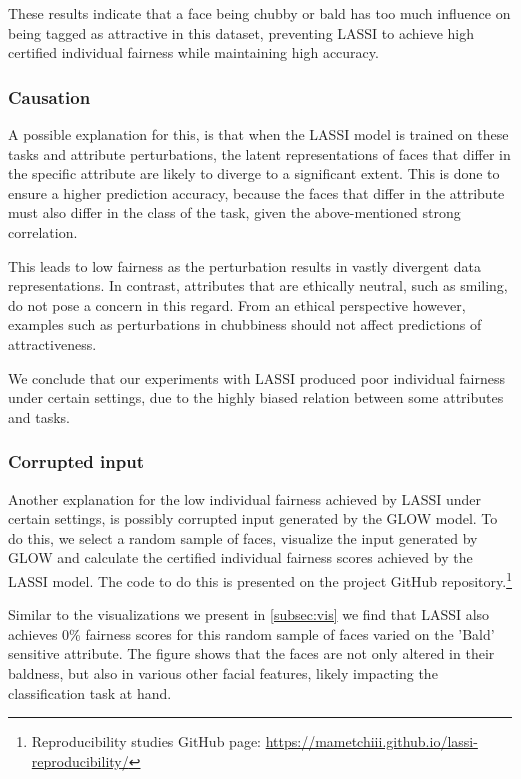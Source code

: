 These results indicate that a face being chubby or bald has too much influence on being tagged as attractive in this dataset, preventing LASSI to achieve high certified individual fairness while maintaining high accuracy.

\subsubsection{Causation}

A possible explanation for this, is that when the LASSI model is trained on these tasks and attribute perturbations, the latent representations of faces that differ in the specific attribute are likely to diverge to a significant extent. This is done to ensure a higher prediction accuracy, because the faces that differ in the attribute must also differ in the class of the task, given the above-mentioned strong correlation. \newline
    
This leads to low fairness as the perturbation results in vastly divergent data representations. In contrast, attributes that are ethically neutral, such as smiling, do not pose a concern in this regard. From an ethical perspective however, examples such as perturbations in chubbiness should not affect predictions of attractiveness. \newline

We conclude that our experiments with LASSI produced poor individual fairness under certain settings, due to the highly biased relation between some attributes and tasks. \newline

\subsubsection{Corrupted input}

Another explanation for the low individual fairness achieved by LASSI under certain settings, is possibly corrupted input generated by the GLOW model. To do this, we select a random sample of faces, visualize the input generated by GLOW and calculate the certified individual fairness scores achieved by the LASSI model. The code to do this is presented on the project GitHub repository.\footnote{Reproducibility studies GitHub page: \url{https://mametchiii.github.io/lassi-reproducibility/}} \newline

Similar to the visualizations we present in \ref{subsec:vis} we find that LASSI also achieves 0\% fairness scores for this random sample of faces varied on the 'Bald' sensitive attribute. The figure shows that the faces are not only altered in their baldness, but also in various other facial features, likely impacting the classification task at hand.

